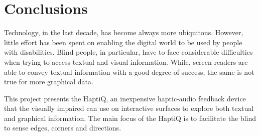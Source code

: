 \chapter{Conclusions}

Technology, in the last decade, has become always more ubiquitous. However, little effort has been spent on enabling the digital world to be used by people with disabilities. Blind people, in particular, have to face considerable difficulties when trying to access textual and visual information. While, screen readers are able to convey textual information with a good degree of success, the same is not true for more graphical data.

This project presents the HaptiQ, an inexpensive haptic-audio feedback device that the visually impaired can use on interactive surfaces to explore both textual and graphical information. The main focus of the HaptiQ is to facilitate the blind to sense edges, corners and directions. 


